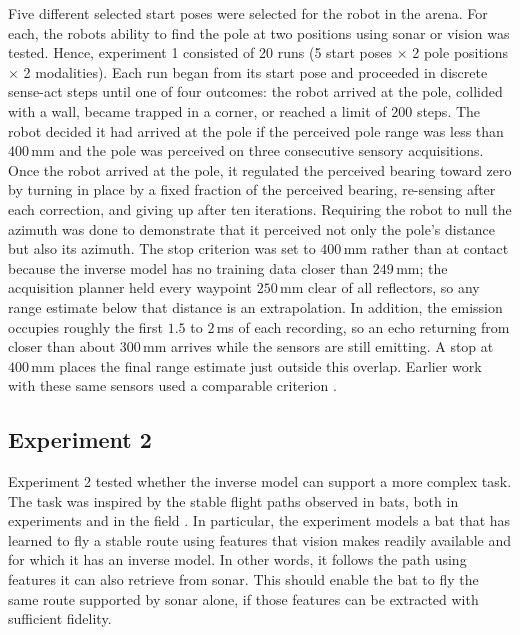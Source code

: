 \documentclass[11pt]{article}
\begin{document}
Five different selected start poses were selected for the robot in the arena. For each, the robots ability to find the pole at two positions using sonar or vision was tested. Hence, experiment 1 consisted of 20 runs (5 start poses $\times$ 2 pole positions $\times$ 2 modalities). Each run began from its start pose and proceeded in discrete sense-act steps until one of four outcomes: the robot arrived at the pole, collided with a wall, became trapped in a corner, or reached a limit of $200$ steps. The robot decided it had arrived at the pole if the perceived pole range was less than $400$\,mm and the pole was perceived on three consecutive sensory acquisitions. Once the robot arrived at the pole, it regulated the perceived bearing toward zero by turning in place by a fixed fraction of the perceived bearing, re-sensing after each correction, and giving up after ten iterations. Requiring the robot to null the azimuth was done to demonstrate that it perceived not only the pole's distance but also its azimuth. The stop criterion was set to $400$\,mm rather than at contact because the inverse model has no training data closer than $249$\,mm; the acquisition planner held every waypoint $250$\,mm clear of all reflectors, so any range estimate below that distance is an extrapolation. In addition, the emission occupies roughly the first $1.5$ to $2$\,ms of each recording, so an echo returning from closer than about $300$\,mm arrives while the sensors are still emitting. A stop at $400$\,mm places the final range estimate just outside this overlap. Earlier work with these same sensors used a comparable criterion \citep{Vanderelst2026}.

\subsection{Experiment 2}

Experiment 2 tested whether the inverse model can support a more complex task. The task was inspired by the stable flight paths observed in bats, both in experiments \citep{Barchi2013} and in the field \citep{Holderied2006}. In particular, the experiment models a bat that has learned to fly a stable route using features that vision makes readily available and for which it has an inverse model. In other words, it follows the path using features it can also retrieve from sonar. This should enable the bat to fly the same route supported by sonar alone, if those features can be extracted with sufficient fidelity. %
\end{document}
